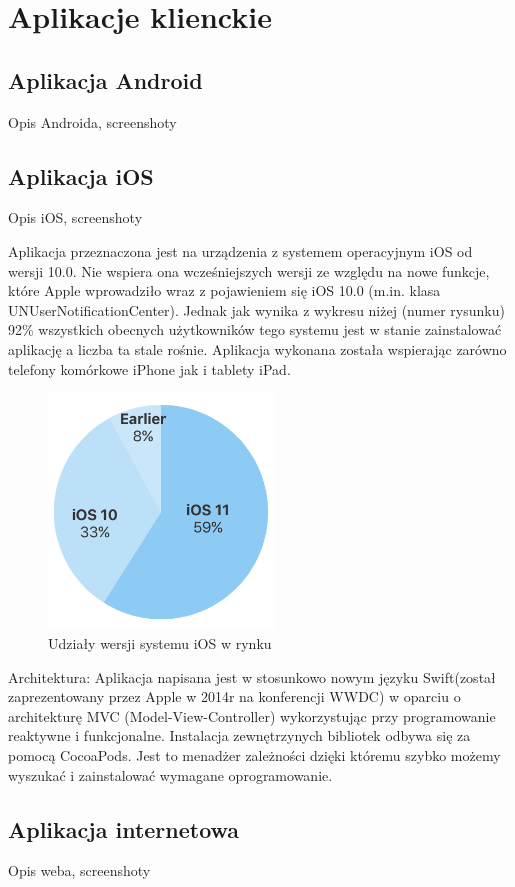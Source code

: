 \chapter{Aplikacje klienckie}

\section*{Aplikacja Android}

Opis Androida, screenshoty


\section*{Aplikacja iOS}

Opis iOS, screenshoty

Aplikacja przeznaczona jest na urządzenia z systemem operacyjnym iOS od wersji 10.0. 
Nie wspiera ona wcześniejszych wersji ze względu na nowe funkcje, które Apple wprowadziło wraz z pojawieniem się iOS 10.0 (m.in. klasa UNUserNotificationCenter). Jednak jak wynika z wykresu niżej (numer rysunku) 92\% wszystkich obecnych użytkowników tego systemu jest w stanie zainstalować aplikację a liczba ta stale rośnie. Aplikacja wykonana została wspierając zarówno telefony komórkowe iPhone jak i tablety iPad. 
\begin{figure}[h]
	\centering
	\includegraphics[width=6cm]{iOSstat}
	\caption{Udziały wersji systemu iOS w rynku}
\end{figure}

Architektura:
Aplikacja napisana jest w stosunkowo nowym języku Swift(został zaprezentowany przez Apple w 2014r na konferencji WWDC) w oparciu o architekturę MVC (Model-View-Controller) wykorzystując przy programowanie reaktywne i funkcjonalne. 
Instalacja zewnętrzynych bibliotek odbywa się za pomocą CocoaPods. Jest to menadżer zależności dzięki któremu szybko możemy wyszukać i zainstalować wymagane oprogramowanie.




\section*{Aplikacja internetowa}

Opis weba, screenshoty